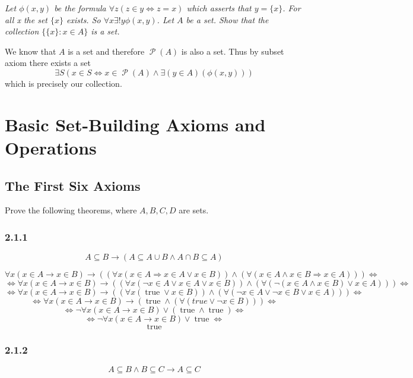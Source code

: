 \documentclass[11pt,oneside,titlepage]{book}
\DeclareMathOperator \pow {\mathcal {P}}
\DeclareMathOperator \lra {\Leftrightarrow}
\DeclareMathOperator \imp {\Rightarrow}
\DeclareMathOperator \true {true}
\begin{document}
\textit{Let $\phi(x, y)$ be the formula $\forall z(z \in y \lra z = x)$ which asserts that
  $y = \{x\}$. For all x the set $\{x\}$ exists. So $\forall x  \exists! y \phi(x, y)$.
  Let $A$ be a set. Show that the collection $\{\{x\}: x \in A\}$ is a set.}

We know that $A$ is a set and therefore $\pow(A)$ is also a set. Thus by subset axiom
there exists a set 
$$\exists S (x \in S \lra x \in \pow(A) \land \exists(y \in A)(\phi(x, y)))$$
which is precisely our collection.

\chapter{Basic Set-Building Axioms and Operations}

\section{The First Six Axioms}

Prove the following theorems, where $A, B, C, D$ are sets.

\subsection*{2.1.1}

$$A \subseteq B \to (A \subseteq A \cup B \land A \cap B \subseteq A )$$

$$ \forall x (x \in A \to x \in B) \to ((\forall x (x \in A \imp x \in A \lor x \in B)) \land
(\forall (x \in A \land x \in B \imp x \in A))) \lra $$
$$ \lra
\forall x (x \in A \to x \in B) \to ((\forall x (\neg x \in A \lor x \in A \lor x \in B)) \land
(\forall (\neg (x \in A \land x \in B) \lor x \in A))) \lra $$
$$ \lra \forall x (x \in A \to x \in B) \to ((\forall x ( \true  \lor x \in B)) \land
(\forall ( \neg x \in A \lor \neg x \in B \lor x \in A))) \lra $$
$$ \lra \forall x (x \in A \to x \in B) \to (\true \land
(\forall ( true \lor \neg x \in B))) \lra $$
$$ \lra \neg \forall x (x \in A \to x \in B) \lor (\true \land \true) \lra $$
$$ \lra \neg \forall x (x \in A \to x \in B) \lor \true \lra $$
$$\true$$

\subsection*{2.1.2}

$$A \subseteq B \land B \subseteq C \to A \subseteq C$$
\end{document}
